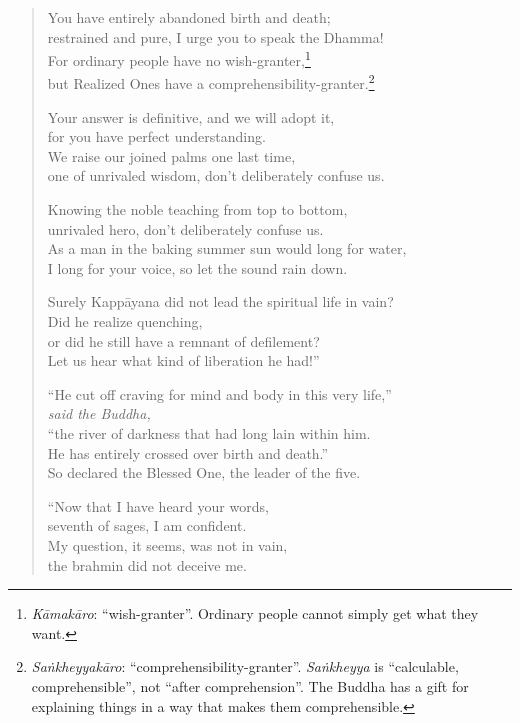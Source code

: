\documentclass[12pt,openany]{book}%
\newcommand*{\scspeaker}[1]{\hspace{2em}\textit{#1}}
\begin{document}
\begin{verse}
You have entirely abandoned birth and death; \\
restrained and pure, I urge you to speak the Dhamma! \\
For ordinary people have no wish-granter,\footnote{\textit{\textsanskrit{Kāmakāro}}: “wish-granter”. Ordinary people cannot simply get what they want. } \\
but Realized Ones have a comprehensibility-granter.\footnote{\textit{\textsanskrit{Saṅkheyyakāro}}: “comprehensibility-granter”. \textit{\textsanskrit{Saṅkheyya}} is “calculable, comprehensible”, not “after comprehension”. The Buddha has a gift for explaining things in a way that makes them comprehensible. } 

Your answer is definitive, and we will adopt it, \\
for you have perfect understanding. \\
We raise our joined palms one last time, \\
one of unrivaled wisdom, don’t deliberately confuse us. 

Knowing the noble teaching from top to bottom, \\
unrivaled hero, don’t deliberately confuse us. \\
As a man in the baking summer sun would long for water, \\
I long for your voice, so let the sound rain down. 

Surely \textsanskrit{Kappāyana} did not lead the spiritual life in vain? \\
Did he realize quenching, \\
or did he still have a remnant of defilement? \\
Let us hear what kind of liberation he had!” 

“He cut off craving for mind and body in this very life,” \\
\scspeaker{said the Buddha, }\\
“the river of darkness that had long lain within him. \\
He has entirely crossed over birth and death.” \\
So declared the Blessed One, the leader of the five. 

“Now that I have heard your words, \\
seventh of sages, I am confident. \\
My question, it seems, was not in vain, \\
the brahmin did not deceive me. 


\end{verse}
\end{document}
